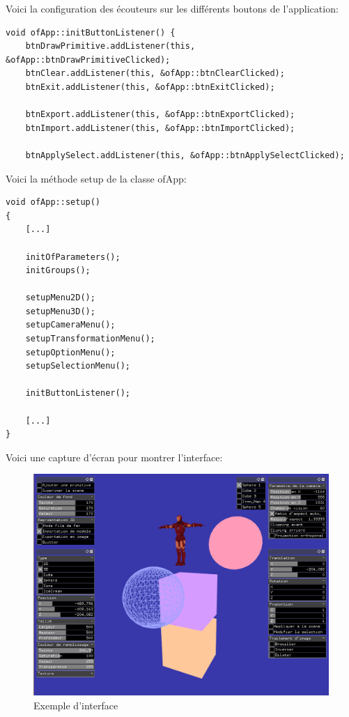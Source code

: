 Voici la configuration des écouteurs sur les différents boutons de l'application:
\begin{lstlisting}
void ofApp::initButtonListener() {
	btnDrawPrimitive.addListener(this, &ofApp::btnDrawPrimitiveClicked);
	btnClear.addListener(this, &ofApp::btnClearClicked);
	btnExit.addListener(this, &ofApp::btnExitClicked);
	
	btnExport.addListener(this, &ofApp::btnExportClicked);
	btnImport.addListener(this, &ofApp::btnImportClicked);
	
	btnApplySelect.addListener(this, &ofApp::btnApplySelectClicked);

\end{lstlisting}

Voici la méthode setup de la classe ofApp:
\begin{lstlisting}
void ofApp::setup()
{
	[...]
	
	initOfParameters();
	initGroups();
	
	setupMenu2D();
	setupMenu3D();
	setupCameraMenu();
	setupTransformationMenu();
	setupOptionMenu();
	setupSelectionMenu();
	
	initButtonListener();
	
	[...]
}
\end{lstlisting}

Voici une capture d'écran pour montrer l'interface:
\begin{figure}[h]
	\centering
	\includegraphics[width=15cm]{fig/InterfaceComplet.png}
	\caption{Exemple d'interface}
	\label{fig:interface}
\end{figure}

\pagebreak
